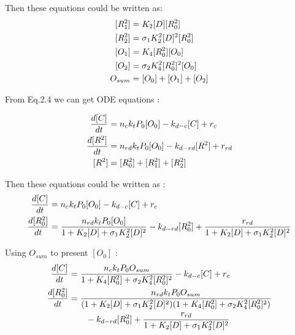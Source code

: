 Then these equations could be written as:
\begin{equation} 
\begin{aligned} 
\centering
[R^2_1] &= K_2[D][R^2_0] \\
[R^2_2] &= \sigma_{1}K_2^2[D]^2[R^2_0] \\
[O_1]   &= K_4[R^2_0][O_0] \\
[O_2]   &= \sigma_{2}K_4^2[R^2_0]^2[O_0] \\
O_{sum} &= [O_0]+[O_1]+[O_2] \\
\end{aligned} 
\end{equation}

From Eq.2.4 we can get ODE equations : 

\begin{equation} 
\begin{aligned} 
\centering
\frac{d[C]}{dt} &= n_c k_t P_0 [O_0] - k_{d-c}[C] + r_c \\
\frac{d[R^2]}{dt} &= n_{rd} k_t P_0 [O_0] - k_{d-rd}[R^2] + r_{rd} \\
[R^2] &= [R_0^2] + [R_1^2] + [R_2^2]
\end{aligned} 
\end{equation}

Then these equations could be written as :
\begin{equation} 
\begin{aligned} 
\centering
\frac{d[C]}{dt} &= n_c k_t P_0 [O_0] - k_{d-c}[C] + r_c \\
\frac{d[R^2_0]}{dt} &= \frac{n_{rd}k_tP_0[O_0]}{1+K_2[D]+\sigma_1K_2^2[D]^2} 
- k_{d-rd}[R^2_0] + \frac{r_{rd}}{1+K_2[D]+\sigma_1K_2^2[D]^2} \\
\end{aligned} 
\end{equation}

Using $O_{sum}$ to present $[O_0]$ :
\begin{equation} 
\begin{aligned} 
\centering
\frac{d[C]}{dt} &= \frac{n_c k_t P_0 O_{sum}}{1+K_4[R_0^2]+\sigma_2 K_4^2 [R_0^2]^2} 
- k_{d-c}[C] + r_c \\
\frac{d[R^2_0]}{dt} &= 
\frac{n_{rd} k_t P_0 O_{sum}}
{(1+K_2[D]+\sigma_1K_2^2[D]^2)(1+K_4[R_0^2]+\sigma_2 K_4^2 [R_0^2]^2)}\\ 
&\qquad - k_{d-rd}[R^2_0] + \frac{r_{rd}}{1+K_2[D]+\sigma_1 K_2^2 [D]^2} \\
\end{aligned} 
\end{equation}



